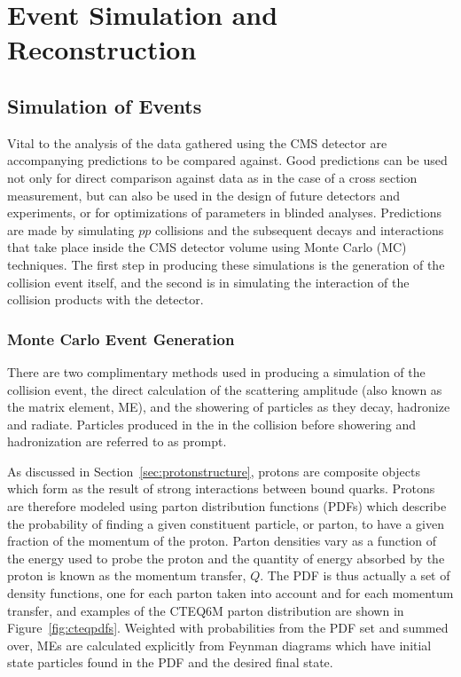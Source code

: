 
\chapter{Event Simulation and Reconstruction}\label{sec:simulation}

\section{Simulation of Events}
 Vital to the analysis of the data
  gathered using the CMS detector
  are accompanying predictions to be compared against.
 Good predictions can be used not only 
  for direct comparison against data
  as in the case of a cross section measurement,
  but can also be used in the design of 
  future detectors and experiments,
  or for optimizations of parameters in blinded analyses.
 Predictions are made by 
  simulating $pp$ collisions and the subsequent
  decays and interactions that take place
  inside the CMS detector volume
  using Monte Carlo (MC) techniques.
 The first step in producing these simulations
  is the generation of the collision event
  itself, and the second
  is in simulating the interaction of the
  collision products with the detector.

\subsection{Monte Carlo Event Generation}
 There are two complimentary methods used
  in producing a simulation of the 
  collision event, the direct calculation 
  of the scattering amplitude
  (also known as the matrix element, ME),
  and the showering of particles as they
  decay, hadronize and radiate.
 Particles produced in the in the 
  collision before showering
  and hadronization are referred to as prompt.

 As discussed in Section~\ref{sec:protonstructure},
  protons are composite objects which form
  as the result of strong 
  interactions between bound quarks.
 Protons are therefore modeled using 
  parton distribution functions (PDFs)
  which describe the probability of
  finding a given constituent particle,
  or parton, to have a given fraction
  of the momentum of the proton.
 Parton densities vary as a function of the
  energy used to probe the proton and the
  quantity of energy absorbed by the 
  proton is known as the momentum transfer, $Q$.
 The PDF is thus actually a set of density functions,
  one for each parton taken into account
  and for each momentum transfer, 
  and examples of the CTEQ6M parton distribution
  are shown in Figure~\ref{fig:cteqpdfs}.
 Weighted with probabilities from the PDF set
  and summed over,
 MEs are calculated explicitly from Feynman
  diagrams which have initial state particles
  found in the PDF and the desired
  final state. 
 

